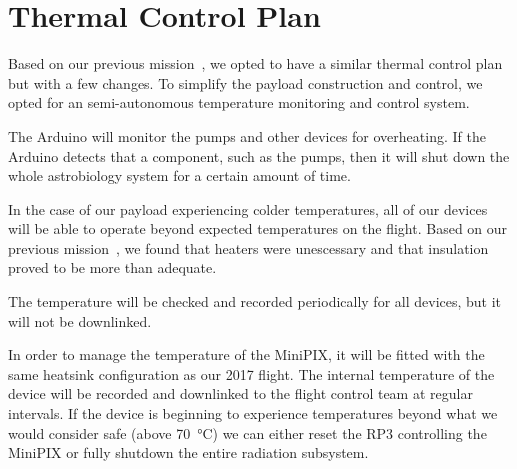\section{Thermal Control Plan}
\label{sec:TCP}


Based on our previous mission~\cite{SORA}, we opted to have a similar thermal control plan but with a few changes.  To simplify the payload construction and control, we opted for an semi-autonomous temperature monitoring and control system.

The Arduino will monitor the pumps and other devices for overheating. If the Arduino detects that a
component, such as the pumps, then it will shut down the whole astrobiology system for a certain amount
of time.

In the case of our payload experiencing colder temperatures, all of our devices will be able to operate beyond expected temperatures on the flight. Based on our previous mission~\cite{SORA}, we found that heaters were unescessary and that insulation proved to be more than adequate.

The temperature will be checked and recorded periodically for all devices, but it will not be downlinked.

In order to manage the temperature of the  MiniPIX, it will be fitted with the same heatsink configuration as our 2017 flight. The internal temperature of the device will be recorded and downlinked to the flight control team at regular intervals. If the device is beginning to experience temperatures beyond what we would consider safe (above \SI{70}{\celsius}) we can either reset the RP3 controlling the MiniPIX or fully shutdown the entire radiation subsystem.
